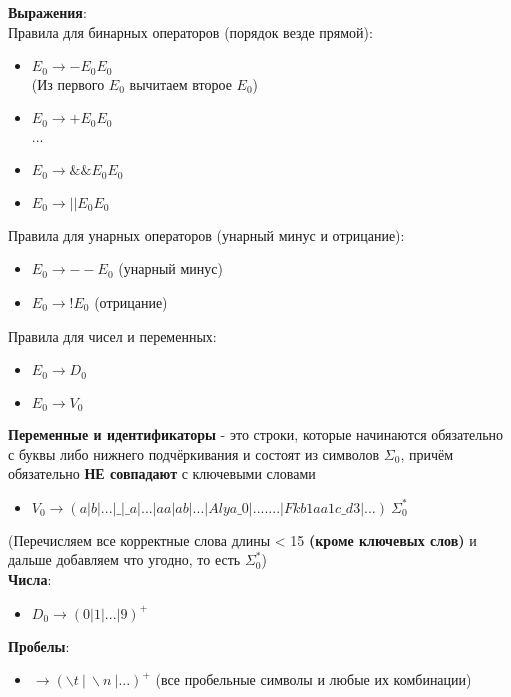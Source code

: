 \documentclass[12pt]{article}
\begin{document}
 
 \textbf{Выражения}: \\
 Правила для бинарных операторов (порядок везде прямой): \\
 \begin{itemize}
	\item $E_0 \to - $\textvisiblespace$ E_0 $\textvisiblespace$ E_0 $ \\
	(Из первого $E_0$ вычитаем второе $E_0$) 
	\item $E_0 \to + $\textvisiblespace$ E_0 $\textvisiblespace$ E_0 $ \\
	...
	\item $E_0 \to \&\& $\textvisiblespace$ E_0 $\textvisiblespace$ E_0 $
	\item $E_0 \to || $\textvisiblespace$ E_0 $\textvisiblespace$ E_0 $

\end{itemize}
  
  Правила для унарных операторов (унарный минус и отрицание): \\
  
  \begin{itemize}
 	\item $E_0 \to  - -  $\textvisiblespace$ E_0$ (унарный минус)
 	\item $E_0 \to  !  $\textvisiblespace$ E_0$ (отрицание)
 \end{itemize}
   
   Правила для чисел и переменных: \\
  
  \begin{itemize}
	\item $E_0 \to D_0$
	\item $E_0 \to V_0$
\end{itemize}

\vspace{\baselineskip}
\vspace{\baselineskip}

 \textbf{Переменные и идентификаторы} - это строки, которые начинаются обязательно с буквы либо нижнего подчёркивания и состоят из символов $\Sigma_0$, причём обязательно \textbf{НЕ совпадают} с ключевыми словами  \\
\begin{itemize}
	\item $V_0 \to (a | b | ... |\_ |\_a| ... |aa|ab|...|Alya\_0| .......|Fkb1aa1c\_d3|...)\ \Sigma_0^*$
\end{itemize}
(Перечисляем все корректные слова длины < 15 \textbf{(кроме ключевых слов)} и дальше добавляем что угодно, то есть $\Sigma_0^*$) \\

\textbf{Числа}: 
\begin{itemize}
	\item $D_0 \to (0|1|...|9)^+$
\end{itemize}

\textbf{Пробелы}: \\

    \begin{itemize}
  	\item \textvisiblespace $\to (\backslash t \ | \ \backslash n \ | ...)^+$
  	(все пробельные символы и любые их комбинации)
  \end{itemize}
\end{document}
